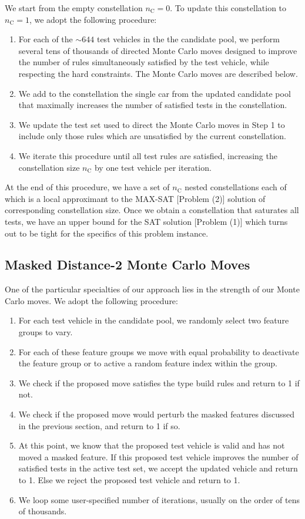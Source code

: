\documentclass[aps,pra,twocolumn,superscriptaddress,groupedaddress]{revtex4}  %
\begin{document}
We start from the empty constellation $n_{\mathrm{C}} = 0$. To update this
constellation to $n_{\mathrm{C}} = 1$, we adopt the following procedure:
\begin{enumerate}
\item For each of the $\sim 644$ test vehicles in the the candidate pool, we
perform several tens of thousands of directed Monte Carlo moves designed to
improve the number of rules simultaneously satisfied by the test vehicle, while
respecting the hard constraints. The Monte Carlo moves are described below.
\item We add to the constellation the single car from the updated candidate pool
that maximally increases the number of satisfied tests in the constellation.
\item We update the test set used to direct the Monte Carlo moves in Step 1 to
include only those rules which are unsatisfied by the current constellation.
\item We iterate this procedure until all test rules are satisfied, increasing
the constellation size $n_{\mathrm{C}}$ by one test vehicle per iteration.
\end{enumerate}
At the end of this procedure, we have a set of $n_{\mathrm{C}}$ nested
constellations each of which is a local approximant to the MAX-SAT [Problem (2)]
solution of corresponding constellation size. Once we obtain a constellation
that saturates all tests, we have an upper bound for the SAT solution [Problem
(1)] which turns out to be tight for the specifics of this problem instance.

\subsection{Masked Distance-2 Monte Carlo Moves}

One of the particular specialties of our approach lies in the strength of our
Monte Carlo moves. We adopt the following procedure:
\begin{enumerate}
\item For each test vehicle in the candidate pool, we randomly select two
feature groups to vary.
\item For each of these feature groups we move with equal probability to
deactivate the feature group or to active a random feature index within the
group.
\item We check if the proposed move satisfies the type build rules and return to
1 if not.
\item We check if the proposed move would perturb the masked features discussed
in the previous section, and return to 1 if so. 
\item At this point, we know that the proposed test vehicle is valid and has not
moved a masked feature. If this proposed test vehicle improves the number of
satisfied tests in the active test set, we accept the updated vehicle and return
to 1. Else we reject the proposed test vehicle and return to 1.
\item We loop some user-specified number of iterations, usually on the order of
tens of thousands.
\end{enumerate}
\end{document}
